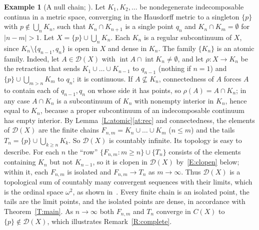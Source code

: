 \documentclass[11pt,reqno]{amsart}
\theoremstyle{plain}
\theoremstyle{definition}
\newtheorem{example}[theorem]{Example}
\theoremstyle{remark}
\newcommand{\D}{\mathcal{D}}
\newcommand{\intr}{\operatorname{int}}
\begin{document}
\begin{example}[A null chain; {\cite[Ejemplo~3.2.1]{Ram23}}]\label{E:chain}
Let $K_1,K_2,\dots$ be nondegenerate indecomposable continua in a metric space, converging in the Hausdorff metric to a singleton $\{p\}$ with $p\notin\bigcup_nK_n$, such that $K_n\cap K_{n+1}$ is a single point $q_n$ and $K_n\cap K_m=\emptyset$ for $|n-m|>1$. Let $X=\{p\}\cup\bigcup_nK_n$. Each $K_n$ is a regular subcontinuum of $X$, since $K_n\setminus\{q_{n-1},q_n\}$ is open in $X$ and dense in $K_n$. The family $\{K_n\}$ is an atomic family. Indeed, let $A\in\D(X)$ with $\intr A\cap\intr K_n\neq\emptyset$, and let $\rho\colon X\to K_n$ be the retraction that sends $K_1\cup\dots\cup K_{n-1}$ to $q_{n-1}$ (nothing if $n=1$) and $\{p\}\cup\bigcup_{m>n}K_m$ to $q_n$; it is continuous. If $A\not\subseteq K_n$, connectedness of $A$ forces $A$ to contain each of $q_{n-1},q_n$ on whose side it has points, so $\rho(A)=A\cap K_n$; in any case $A\cap K_n$ is a subcontinuum of $K_n$ with nonempty interior in $K_n$, hence equal to $K_n$, because a proper subcontinuum of an indecomposable continuum has empty interior. By Lemma~\ref{L:atomic}\ref{at:rec} and connectedness, the elements of $\D(X)$ are the finite chains $F_{n,m}=K_n\cup\dots\cup K_m$ ($n\le m$) and the tails $T_n=\{p\}\cup\bigcup_{k\ge n}K_k$. So $\D(X)$ is countably infinite. Its topology is easy to describe. For each $n$ the ``row'' $\{F_{n,m}:m\ge n\}\cup\{T_n\}$ consists of the elements containing $K_n$ but not $K_{n-1}$, so it is clopen in $\D(X)$ by~\eqref{E:clopen} below; within it, each $F_{n,m}$ is isolated and $F_{n,m}\to T_n$ as $m\to\infty$. Thus $\D(X)$ is a topological sum of countably many convergent sequences with their limits, which is the ordinal space $\omega^2$, as shown in~\cite{Ram23}. Every finite chain is an isolated point, the tails are the limit points, and the isolated points are dense, in accordance with Theorem~\ref{T:main}. As $n\to\infty$ both $F_{n,m}$ and $T_n$ converge in $C(X)$ to $\{p\}\notin\D(X)$, which illustrates Remark~\ref{R:complete}.
\end{example}
\end{document}
